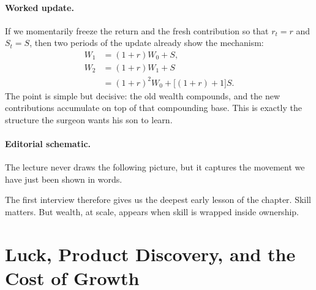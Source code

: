 \paragraph{Worked update.}
If we momentarily freeze the return and the fresh contribution so that \(r_t=r\) and \(S_t=S\), then two periods of the update already show the mechanism:
\begin{align}
W_1 &= (1+r)W_0 + S,\\
W_2 &= (1+r)W_1 + S \\
&= (1+r)^2W_0 + \bigl[(1+r)+1\bigr]S.
\end{align}
The point is simple but decisive: the old wealth compounds, and the new contributions accumulate on top of that compounding base. This is exactly the structure the surgeon wants his son to learn.

\paragraph{Editorial schematic.}
The lecture never draws the following picture, but it captures the movement we have just been shown in words.

\begin{figure}
\centering
{}
\end{figure}

The first interview therefore gives us the deepest early lesson of the chapter. Skill matters. But wealth, at scale, appears when skill is wrapped inside ownership.

\section{Luck, Product Discovery, and the Cost of Growth}

